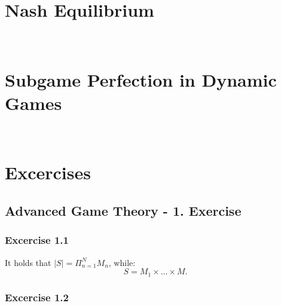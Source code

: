 \documentclass[12pt]{extreport} %
\theoremstyle{named}
\theoremstyle{itshape}
\theoremstyle{normal}
\begin{document}
~\newpage

\section{Nash Equilibrium}
 
~\newpage 
 
\section{Subgame Perfection in Dynamic Games}

~\newpage

\section{Excercises}

\subsection*{Advanced Game Theory - 1. Exercise}

\subsubsection*{Excercise 1.1}
	It holds that $|S| = \Pi_{n=1}^{N} M_{n}$, while:
	$$ S = M_{1} \times \dots \times M. $$

\subsubsection*{Excercise 1.2}	

\end{document}
